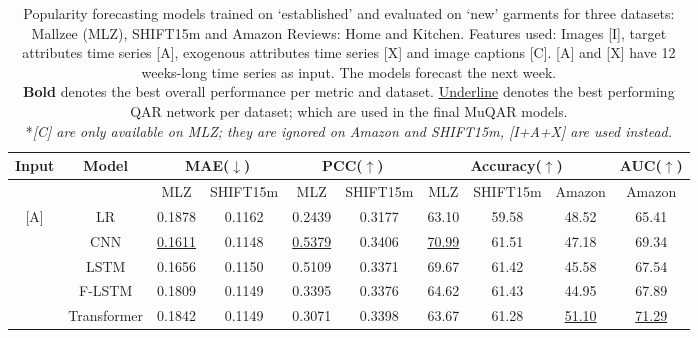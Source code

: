 \documentclass{article}
\begin{document}
\begin{table*}
\footnotesize
\centering
  \caption{Popularity forecasting models trained on `established' and evaluated on `new' garments for three datasets: Mallzee (MLZ), SHIFT15m and Amazon Reviews: Home and Kitchen.
  Features used: Images [I], target attributes time series [A], exogenous attributes time series [X] and image captions [C].
  [A] and [X] have 12 weeks-long time series as input. 
  The models forecast the next week. \\
  \textbf{Bold} denotes the best overall performance per metric and dataset. 
  \underline{Underline} denotes the best performing QAR network per dataset; which are used in the final MuQAR models. \\
  *\textit{[C] are only available on MLZ; they are ignored on Amazon and SHIFT15m, [I+A+X] are used instead.}
  }
  \label{tab:results_ablation}
  \begin{tabular}{cc|cc|cc|ccc|c}
    \toprule
     \multicolumn{1}{c}{\textbf{Input}} & 
     \multicolumn{1}{c}{\textbf{Model}} & 
     \multicolumn{2}{c}{\textbf{MAE($\downarrow$) }} & 
     \multicolumn{2}{c}{\textbf{PCC($\uparrow$) }} & 
     \multicolumn{3}{c}{\textbf{Accuracy($\uparrow$) }} &
     \multicolumn{1}{c}{\textbf{AUC($\uparrow$) }} 
     \\
     
    \midrule
    
    && MLZ & SHIFT15m & MLZ & SHIFT15m & MLZ & SHIFT15m & Amazon & Amazon\\
    
    \midrule
    
    \multirow{6}{*}{[A]} &
    LR & 0.1878 & 0.1162 & 0.2439 & 0.3177 & 63.10 & 59.58 & 48.52 & 65.41 \\
    
    &
    CNN & \underline{0.1611} & 0.1148 & \underline{0.5379} & 0.3406 & \underline{70.99} & 61.51 & 47.18 & 69.34 \\
    
    &
    LSTM & 0.1656 & 0.1150 & 0.5109 & 0.3371 & 69.67 & 61.42 & 45.58 & 67.54 \\
    
    &
    F-LSTM & 0.1809 & 0.1149 & 0.3395 & 0.3376 & 64.62 & 61.43 & 44.95 & 67.89 \\
    
    &
    Transformer & 0.1842 & 0.1149 & 0.3071 & 0.3398 & 63.67 & 61.28 & \underline{51.10} & \underline{71.29} \\
    

\end{tabular}
\end{table*}
\end{document}
